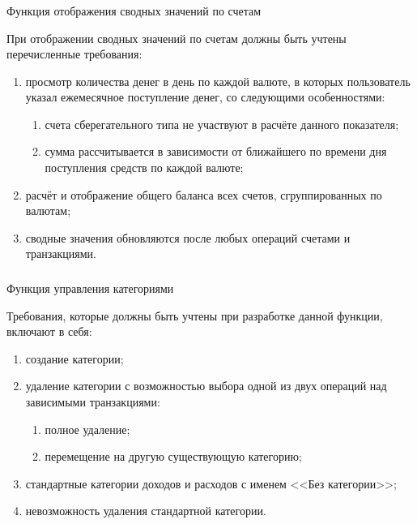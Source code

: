 \subsubsection{} Функция отображения сводных значений по счетам
\label{sec:domain:specification:wallets_stats}

При отображении сводных значений по счетам должны быть учтены перечисленные требования:

\begin{enumerate}
    \item просмотр количества денег в день по каждой валюте, в которых пользователь указал ежемесячное поступление денег, со следующими особенностями:
    \begin{enumerate}
        \item счета сберегательного типа не участвуют в расчёте данного показателя;
        \item сумма рассчитывается в зависимости от ближайшего по времени дня поступления средств по каждой валюте;
    \end{enumerate}
    \item расчёт и отображение общего баланса всех счетов, сгруппированных по валютам;
    \item сводные значения обновляются после любых операций счетами и транзакциями.
\end{enumerate}

\subsubsection{} Функция управления категориями
\label{sec:domain:specification:categories}

Требования, которые должны быть учтены при разработке данной функции, включают в себя:

\begin{enumerate}
    \item создание категории;
    \item удаление категории с возможностью выбора одной из двух операций над зависимыми транзакциями:
    \begin{enumerate}
        \item полное удаление;
        \item перемещение на другую существующую категорию;
    \end{enumerate}
    \item стандартные категории доходов и расходов с именем <<Без категории>>;
    \item невозможность удаления стандартной категории.
\end{enumerate}

